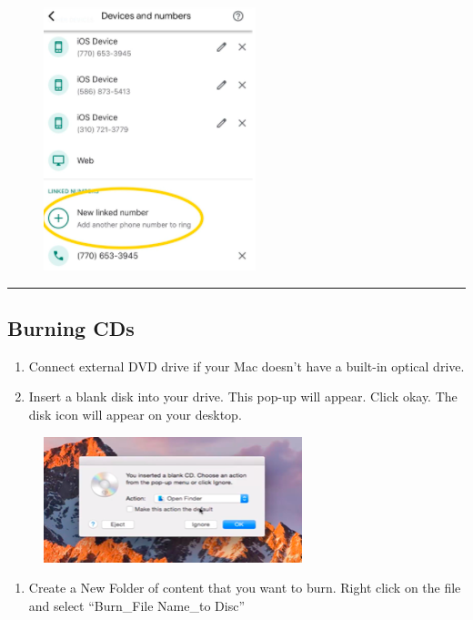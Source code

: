 \documentclass[]{book}
\providecommand{\tightlist}{%
  \setlength{\itemsep}{0pt}\setlength{\parskip}{0pt}}
\begin{document}
\begin{figure}
\centering
\includegraphics{images/research_protocols/google_voice/pic7.png}
\caption{}
\end{figure}

\begin{center}\rule{0.5\linewidth}{0.5pt}\end{center}

\subsection{Burning CDs}\label{burning-cds}

\begin{enumerate}
\def\labelenumi{\arabic{enumi}.}
\item
  Connect external DVD drive if your Mac doesn't have a built-in optical
  drive.
\item
  Insert a blank disk into your drive. This pop-up will appear. Click
  okay. The disk icon will appear on your desktop.
\end{enumerate}

\begin{figure}
\centering
\includegraphics{images/lab_protocols/cd_burning/1.png}
\caption{}
\end{figure}

\begin{enumerate}
\def\labelenumi{\arabic{enumi}.}
\setcounter{enumi}{2}
\tightlist
\item
  Create a New Folder of content that you want to burn. Right click on
  the file and select ``Burn\_File Name\_to Disc''
\end{enumerate}
\end{document}
